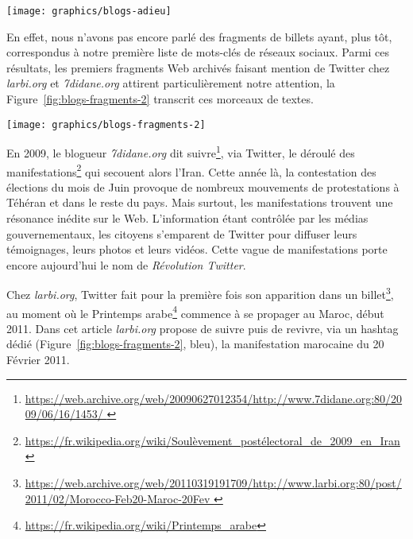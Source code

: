 \documentclass[symmetric,justified,marginals=raggedouter]{tufte-book}
\begin{document}
\newpage

\begin{figure*}
  \texttt{[image: graphics/blogs-adieu]}
  \caption{Annonce de la fermeture de \textit{7didane.org} (a) et article précédant la clôture de \textit{larbi.org} (b)}
  \label{fig:blogs-adieu}
\end{figure*} 

\noindent En effet, nous n'avons pas encore parlé des fragments de billets ayant, plus tôt, correspondus à notre première liste de mots-clés de réseaux sociaux. Parmi ces résultats, les premiers fragments Web archivés faisant mention de Twitter chez \textit{larbi.org} et \textit{7didane.org} attirent particulièrement notre attention, la Figure~\ref{fig:blogs-fragments-2} transcrit ces morceaux de textes. 

\begin{figure*}
  \texttt{[image: graphics/blogs-fragments-2]}
  \caption{Premiers fragments Web archivés faisant mention de Twitter chez \textit{larbi.org} \textit{7didane.org}}
  \label{fig:blogs-fragments-2}
\end{figure*}

\newpage

\noindent En 2009, le blogueur \textit{7didane.org} dit suivre\footnote{\RaggedOuter \url{https://web.archive.org/web/20090627012354/http://www.7didane.org:80/2009/06/16/1453/
}}, via Twitter, le déroulé des manifestations\footnote{\RaggedOuter \url{https://fr.wikipedia.org/wiki/Soulèvement\_postélectoral\_de\_2009\_en\_Iran}} qui secouent alors l'Iran. Cette année là, la contestation des élections du mois de Juin provoque de nombreux mouvements de protestations à Téhéran et dans le reste du pays. Mais surtout, les manifestations trouvent une résonance inédite sur le Web. L'information étant contrôlée par les médias gouvernementaux, les ci\-toyens s'emparent de Twitter pour diffuser leurs témoignages, leurs photos et leurs vidéos. Cette vague de manifestations porte encore aujourd'hui le nom de \textit{Révolution Twitter}. 

Chez \textit{larbi.org}, Twitter fait pour la première fois son apparition dans un billet\footnote{\RaggedOuter \url{https://web.archive.org/web/20110319191709/http://www.larbi.org:80/post/2011/02/Morocco-Feb20-Maroc-20Fev
}}, au moment où le Printemps arabe\footnote{\RaggedOuter \url{https://fr.wikipedia.org/wiki/Printemps_arabe}} commence à se pro\-pager au Maroc, début 2011. Dans cet article \textit{larbi.org} propose de suivre puis de revivre, via un hashtag dédié (Figure~\ref{fig:blogs-fragments-2}, bleu), la manifestation marocaine du 20 Février 2011.
\end{document}
